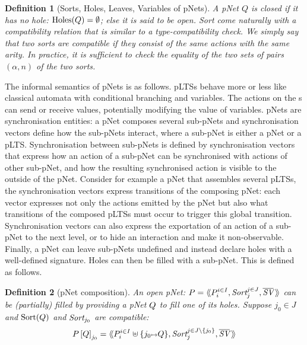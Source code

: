 \documentclass{lmcs}
\newtheorem{definition}{Definition}
\begin{document}
\begin{definition}[Sorts, Holes, Leaves, Variables of pNets]
A pNet $Q$ is \emph{closed} if it has no hole: $\operatorname{Holes}(Q)=\emptyset$; else it
is said to be \emph{open}.
Sort come naturally with a compatibility relation that is similar to a type-compatibility check. We simply say that two sorts are compatible if they consist of the same actions with the same arity. In practice, it is sufficient to check the equality of the two sets of pairs $(\alpha,n)$ of the two sorts.
\end{definition}
  
The informal semantics of pNets is as follows. pLTSs behave more or less like  classical automata with conditional branching and variables. The actions on the \pLTS s can send or receive values, potentially modifying the value of variables. 
pNets are synchronisation entities: a pNet composes several sub-pNets and  synchronisation vectors define how the sub-pNets interact, where a sub-pNet is either a pNet or a pLTS. Synchronisation between sub-pNets is defined by synchronisation vectors that express how an action of a sub-pNet can be synchronised with actions of other sub-pNet, and how the resulting synchronised action is visible to the outside of the pNet. 
Consider for example a pNet that assembles several pLTSs, the synchronisation vectors express transitions of the composing pNet: each vector expresses not only the actions emitted by the pNet but also what transitions of the composed pLTSs must occur to trigger this global transition.
Synchronisation vectors can also express the exportation of an action of a sub-pNet to the next level, or to hide an interaction and make it non-observable. Finally, a pNet can leave sub-pNets undefined and instead declare holes with a well-defined signature. Holes can then be filled with a sub-pNet. This is defined as follows.



\begin{definition}[pNet composition]
	An open pNet: $\pNet = \mylangle \pNet_i^{i\in I}, \Sort_j^{j\in J}, 
	\set{\symb{SV}}\,\myrangle$
 can be (partially) filled by providing  a pNet $Q$ to fill one of  its holes.	
	Suppose $j_0\in J$ and $\operatorname{Sort}(Q)$ and $\Sort_{j_0}$ are compatible:
	\[\pNet\left[\pNetQ\right]_{j_0}= \mylangle 
	\pNet_i^{i\in I}\uplus\{j_0\mapsto \pNetQ\},\Sort_j^{j\in J\setminus \{j_0\}},
	\set{\symb{SV}}\,\myrangle
	\]
\end{definition}
\end{document}
